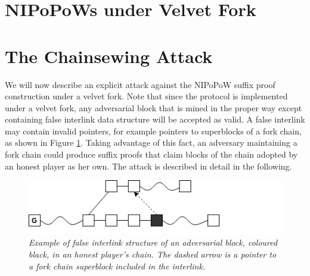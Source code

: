 \documentclass[9pt,a4paper]{article}
\begin{document}
\section{NIPoPoWs under Velvet Fork}

\section{The Chainsewing Attack}
We  will now describe an explicit attack against the NIPoPoW suffix proof construction under a velvet fork. Note that since the protocol is implemented under a velvet fork, any adversarial block that is mined in the proper way except containing false interlink data structure will be accepted as valid. A false interlink may contain invalid pointers, for example pointers to superblocks of a fork chain, as shown in Figure \ref{fig:false_interlink}.
Taking advantage of this fact, an adversary maintaining a fork chain could produce suffix proofs that claim blocks of the chain adopted by an honest player as her own. The attack is described in detail in the following.

\begin{figure}[h]
	\begin{center}
		\includegraphics[scale=0.6]{figures/false_interlink.png}
	\end{center}
	\caption{\textit{Example of false interlink structure of an adversarial block, coloured black, in an honest player's chain. The dashed arrow is a pointer to a fork chain superblock included in the interlink.}}
	\label{fig:false_interlink}
\end{figure}
\end{document}

